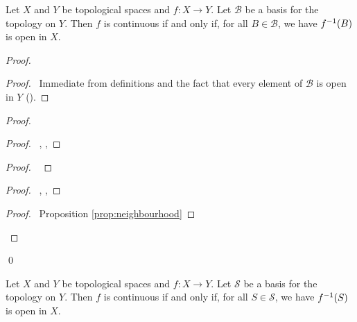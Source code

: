 \begin{prop}
  \label{prop:continuous:basis}
  Let $X$ and $Y$ be topological spaces and $f : X \rightarrow Y$. Let $\mathcal{B}$ be a basis for the topology on $Y$. Then $f$ is continuous if and only if, for all $B \in \mathcal{B}$, we have ${f}^{-1}(B)$ is open in $X$.
\end{prop}

\begin{proof}
  \pf
  \begin{proof}
    \pf\ Immediate from definitions and the fact that every element of $\mathcal{B}$ is open in $Y$ ().
  \end{proof}
  \begin{proof}
    \begin{proof}
      \pf\ , , 
    \end{proof}
    \begin{proof}
      \pf\ 
    \end{proof}
    \begin{proof}
      \pf\ , , 
    \end{proof}
    \qedstep
    \begin{proof}
      \pf\ Proposition \ref{prop:neighbourhood}
    \end{proof}
  \end{proof}
  \qed
\end{proof}

\begin{prop}
  \label{prop:continuous:subbasis}
  Let $X$ and $Y$ be topological spaces and $f : X \rightarrow Y$. Let $\mathcal{S}$ be a basis for the topology on $Y$. Then $f$ is continuous if and only if, for all $S \in \mathcal{S}$, we have ${f}^{-1}(S)$ is open in $X$.
\end{prop}

